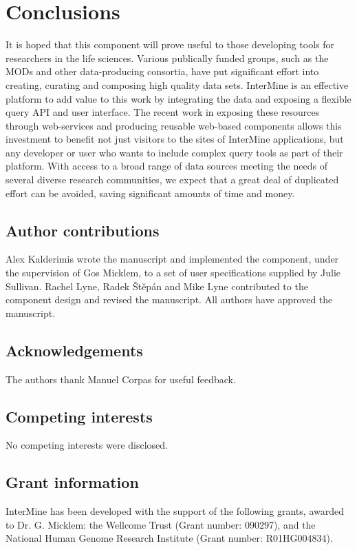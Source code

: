 \documentclass[10pt,a4paper,twocolumn]{article}
\begin{document}
\section*{Conclusions}

It is hoped that this component will prove useful to those developing tools for
researchers in the life sciences. Various publically funded groups, such as the
MODs and other data-producing consortia, have put significant effort into
creating, curating and composing high quality data sets. InterMine is an
effective platform to add value to this work by integrating the data and
exposing a flexible query API and user interface. The recent work in exposing
these resources through web-services and producing reusable web-based components
allows this investment to benefit not just visitors to the sites of InterMine
applications, but any developer or user who wants to include complex query tools
as part of their platform. With access to a broad range of data sources meeting
the needs of several diverse research communities, we expect that a great deal
of duplicated effort can be avoided, saving significant amounts of time and
money.

\subsection*{Author contributions}
Alex Kalderimis wrote the manuscript and implemented the component, under the
supervision of Gos Micklem, to a set of user specifications supplied by Julie
Sullivan. Rachel Lyne, Radek Štěpán and Mike Lyne contributed to the
component design and revised the manuscript. All authors have approved the
manuscript.

\subsection*{Acknowledgements}
The authors thank Manuel Corpas for useful feedback.

\subsection*{Competing interests}
No competing interests were disclosed.

\subsection*{Grant information}
InterMine has been developed with the support of the following grants, awarded
to Dr. G. Micklem: the Wellcome Trust (Grant number: 090297),
and the National Human Genome Research Institute (Grant number: R01HG004834).
\end{document}
